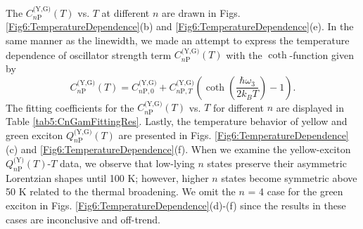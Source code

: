 \documentclass[aps,reprint,amsmath,amssymb,prb]{revtex4-1}
\begin{document}
The $C_{n\text{P}}^{\text{(Y,G)}}(T)$ vs. $T$ at different $n$ are drawn in Figs. \ref{Fig6:TemperatureDependence}(b) and \ref{Fig6:TemperatureDependence}(e). In the same manner as the linewidth, we made an attempt to express the temperature dependence of oscillator strength term $C_{n\text{P}}^{\text{(Y,G)}}(T)$ with the $\operatorname{coth}$-function given by 
\begin{equation}\label{eq:cnp}
C_{n\text{P}}^{\text{(Y,G)}}(T) = C_{n \text{P}, 0}^{\text{(Y,G)}} + C_{n \text{P}, T}^{\text{(Y,G)}}\left( \operatorname{coth}\left(\frac{\hbar \omega_3}{2 k_B T}\right)-1\right).
\end{equation}
The fitting coefficients for the $C_{n\text{P}}^{\text{(Y,G)}}(T)$ vs. $T$ for different $n$ are displayed in Table \ref{tab5:CnGamFittingRes}. 
Lastly, the temperature behavior of yellow and green exciton  $Q_{n\text{P}}^{\text{(Y,G)}}(T)$ are presented in Figs. \ref{Fig6:TemperatureDependence}(c) and \ref{Fig6:TemperatureDependence}(f). When we examine the yellow-exciton $Q_{n\text{P}}^{\text{(Y)}}(T)$-$T$ data, we observe that low-lying $n$ states preserve their asymmetric Lorentzian shapes until 100 K; however, higher $n$ states become symmetric above 50 K related to the thermal broadening. We omit the $n$ = 4 case for the green exciton in Figs. \ref{Fig6:TemperatureDependence}(d)-(f) since the results in these cases are inconclusive and off-trend.
\end{document}
